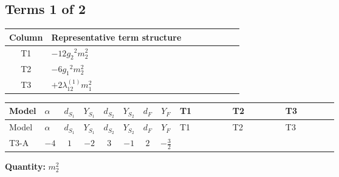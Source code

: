 \documentclass[8pt]{article}
\begin{document}
\begin{landscape}
\subsection*{Terms 1 of 2}
\begin{center}
\begin{tabular}{@{}c >{\raggedright\arraybackslash}p{0.82\linewidth}@{}}
\toprule
Column & Representative term structure \\
\midrule
T1 & \(\displaystyle -12 {g_2}^2 {m_2^2}\) \\
\midrule
T2 & \(\displaystyle -6 {g_1}^2 {m_2^2}\) \\
\midrule
T3 & \(\displaystyle +2 {\lambda_{12}^{(1)}} {m_1^2}\) \\
\midrule
\bottomrule
\end{tabular}
\end{center}
\smallskip
\tiny
\begin{longtable}{@{}llcccccc >{\raggedright\arraybackslash}p{0.21\linewidth} >{\raggedright\arraybackslash}p{0.21\linewidth} >{\raggedright\arraybackslash}p{0.21\linewidth}@{}}
\toprule
Model & $\alpha$ & $d_{S_1}$ & $Y_{S_1}$ & $d_{S_2}$ & $Y_{S_2}$ & $d_F$ & $Y_F$ & T1 & T2 & T3 \\
\midrule
\endfirsthead
\toprule
Model & $\alpha$ & $d_{S_1}$ & $Y_{S_1}$ & $d_{S_2}$ & $Y_{S_2}$ & $d_F$ & $Y_F$ & T1 & T2 & T3 \\
\midrule
\endhead
T3-A & $-4$ & $1$ & $-2$ & $3$ & $-1$ & $2$ & $-\frac{3}{2}$ & \scriptsize\adjustbox{max width=\linewidth}{$\begin{gathered} -12 {g_2}^2 {m_2^2}\end{gathered}$} & \scriptsize\adjustbox{max width=\linewidth}{$\begin{gathered} -6 {g_1}^2 {m_2^2}\end{gathered}$} & \scriptsize\adjustbox{max width=\linewidth}{$\begin{gathered} +2 {\lambda_{12}^{(1)}} {m_1^2}\end{gathered}$} \\
\midrule
\bottomrule
\end{longtable}
\clearpage
\noindent\textbf{Quantity: }$m_2^2$\par\smallskip

\end{landscape}
\end{document}
